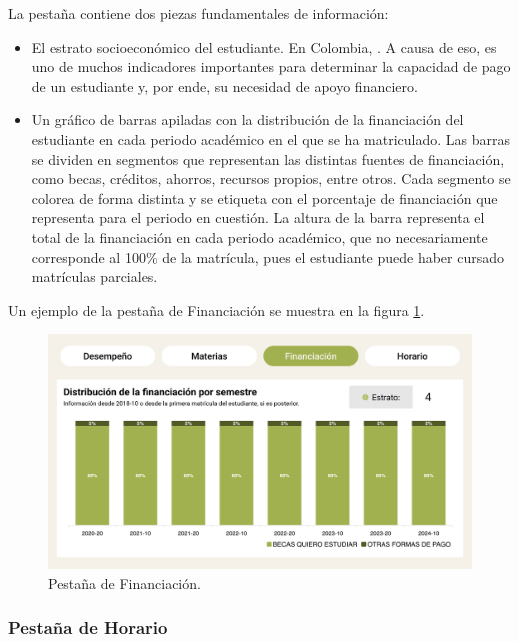 La pestaña contiene dos piezas fundamentales de información:
\begin{itemize}
	\item El estrato socioeconómico del estudiante. En Colombia,  \cite{estrato}. A causa de eso, es uno de muchos indicadores importantes para determinar la capacidad de pago de un estudiante y, por ende, su necesidad de apoyo financiero.
	\item Un gráfico de barras apiladas con la distribución de la financiación del estudiante en cada periodo académico en el que se ha matriculado. Las barras se dividen en segmentos que representan las distintas fuentes de financiación, como becas, créditos, ahorros, recursos propios, entre otros. Cada segmento se colorea de forma distinta y se etiqueta con el porcentaje de financiación que representa para el periodo en cuestión. La altura de la barra representa el total de la financiación en cada periodo académico, que no necesariamente corresponde al 100\% de la matrícula, pues el estudiante puede haber cursado matrículas parciales.
\end{itemize}
Un ejemplo de la pestaña de Financiación se muestra en la figura \ref{fig:financiacion}.

\begin{figure}[H]
	\includegraphics[width=\textwidth]{assets/nes/financiacion.png}
	\caption{Pestaña de Financiación.}
	\label{fig:financiacion}
\end{figure}

\subsubsection{Pestaña de Horario}

